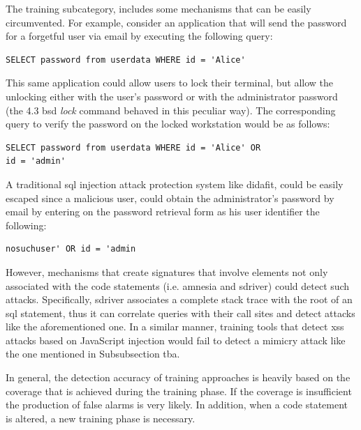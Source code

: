 \documentclass[conference]{IEEEtran}
\begin{document}
The training subcategory, includes some mechanisms
that can be easily circumvented. For example,
consider an application that will send the password 
for a forgetful user via email by executing
the following query:
\bgroup
\lstset{language=SQL}
\begin{small}
\begin{lstlisting}
SELECT password from userdata WHERE id = 'Alice'
\end{lstlisting}
\end{small}
\egroup
\noindent
This same application could allow users to lock their terminal,
but allow the unlocking either with the user's password or with
the administrator password (the 4.3 {\sc bsd} {\em lock} command
behaved in this peculiar way).
The corresponding query to verify the password on the locked
workstation would be as follows:
\bgroup
\lstset{language=SQL}
\begin{small}
\begin{lstlisting}
SELECT password from userdata WHERE id = 'Alice' OR
id = 'admin'
\end{lstlisting}
\end{small}
\egroup
\noindent
A traditional {\sc sql} injection attack protection system like {\sc didafit},
could be easily escaped since a malicious user, could obtain the
administrator's password by email by entering on the password retrieval form
as his user identifier the following:
\bgroup
\lstset{language=SQL}
\begin{small}
\begin{lstlisting}
nosuchuser' OR id = 'admin
\end{lstlisting}
\end{small}
\egroup
\noindent
However, mechanisms that create signatures that involve
elements not only associated with the code statements
(i.e. {\sc amnesia} and {\sc sd}river)
could detect such attacks. Specifically,
{\sc sd}river associates a complete stack trace with the
root of an {\sc sql} statement, thus it can correlate
queries with their call sites and detect attacks
like the aforementioned one.
In a similar manner, training tools that detect
{\sc xss} attacks based on JavaScript injection
would fail to detect a mimicry attack like the
one mentioned in Subsubsection {\sc tba}.

In general, the detection accuracy of training approaches is
heavily based on the coverage that is achieved during the
training phase. If the coverage is insufficient the
production of false alarms is very likely.
In addition, when a code statement is altered, a new
training phase is necessary.
\end{document}
